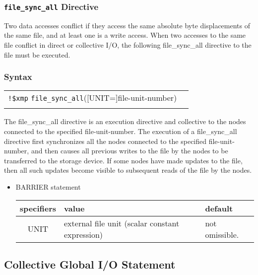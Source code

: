    \subsubsection{{\tt file\_sync\_all} Directive}
   Two data accesses conflict if they access the same absolute byte
   displacements of the same file, and at least one is a write access. 
   When two accesses to the same file conflict in direct or collective I/O,
   the following file\_sync\_all directive to the file must be executed.

   \subsubsection*{Syntax}

   \begin{tabular}{ll}
     \verb|!$xmp| {\tt file\_sync\_all}([UNIT=]file-unit-number) \\
      \\
   \end{tabular}

   The file\_sync\_all directive is an execution directive and
   collective to the nodes connected to the specified
   file-unit-number.
   The execution of a file\_sync\_all directive first synchronizes all
   the nodes connected to the specified file-unit-number, and then causes
   all previous writes to the file by the nodes to be transferred to
   the storage device.
   If some nodes have made updates to the file, then all such updates
   become visible to subsequent reads of the file by the nodes.

   \begin{itemize}
     \item BARRIER statement

   \begin{table}[h]
    \begin{center}
     \label{tb:globalopen}
     \begin{tabular}{|c||p{90mm}|l|}
       \hline
       specifiers & value & default \\ \hline \hline
       UNIT & external file unit (scalar constant expression)
       & not omissible. \\ \hline
     \end{tabular}
    \end{center}
   \end{table}

   \end{itemize}
\fi

   
   \subsection{Collective Global I/O Statement}

